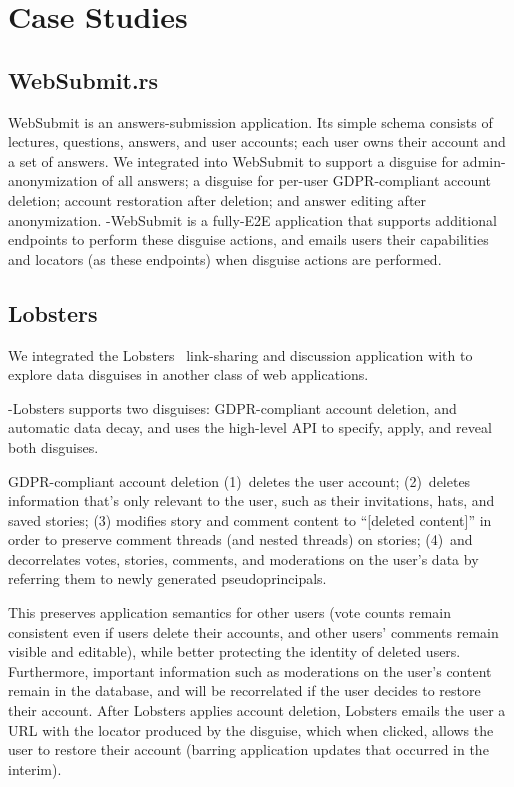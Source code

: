\section{Case Studies}

\subsection{WebSubmit.rs}
WebSubmit is an answers-submission application. Its simple schema consists of lectures, questions,
answers, and user accounts; each user owns their account and a set of answers. We integrated \sys
into WebSubmit to support a disguise for admin-anonymization of all answers; a disguise for per-user
GDPR-compliant account deletion; account restoration after deletion; and answer editing after
anonymization.  \sys-WebSubmit is a fully-E2E application that supports additional endpoints to
perform these disguise actions, and emails users their capabilities and locators (as these
endpoints) when disguise actions are performed.

\subsection{Lobsters} 
We integrated the Lobsters~\cite{lobsters} link-sharing and discussion
application with \sys to explore data disguises in another class of web applications.

\sys-Lobsters supports two disguises: GDPR-compliant account deletion, and automatic data decay, and uses the high-level \sys API to specify, apply, and reveal both disguises.

GDPR-compliant account deletion 
%
(1)~deletes the user account;
%
(2)~deletes information that's only relevant to the user, such as their invitations, hats, and saved
stories;
%
(3) modifies story and comment content to ``[deleted content]'' in order to preserve comment threads
(and nested threads) on stories;
%
(4)~and decorrelates votes, stories, comments, and moderations on the user's data by referring them
to newly generated pseudoprincipals.
%

This preserves application semantics for other users (\eg vote counts remain consistent even if
users delete their accounts, and other users' comments remain visible and editable), while better
protecting the identity of deleted users.  Furthermore, important information such as moderations on
the user's content remain in the database, and will be recorrelated if the user decides to restore
their account.  After Lobsters applies account deletion, Lobsters emails the user a URL with the
locator produced by the disguise, which when clicked, allows the user to restore their account
(barring application updates that occurred in the interim).

